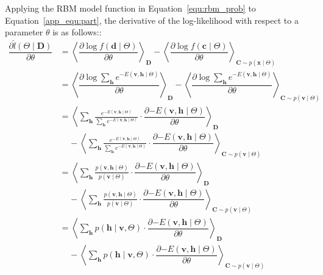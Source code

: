 Applying the RBM model function in Equation~\ref{equ:rbm_prob} to Equation~\ref{app_equ:part}, the derivative of the log-likelihood with respect to a parameter $\theta$ is as follows::
\begin{equation}
\begin{aligned}
\dfrac{\partial \hat{l} (\Theta \mid \mathbf{D})}{\partial \theta} 
& = \left \langle \dfrac{\partial \log f(\mathbf{d} \mid \Theta)}{\partial \theta}\right \rangle_{\mathbf{D}} -\left \langle \dfrac{\partial \log f(\mathbf{c} \mid \Theta)}{\partial \theta}\right \rangle_{\mathbf{C} \sim p(\mathbf{x} \mid \Theta)}  \\
& = \left \langle \dfrac{\partial \log \sum_{ \mathbf{h}} e^{{-E}(\mathbf{v}, \mathbf{h} \mid \Theta)}}{\partial \theta}\right \rangle_{\mathbf{D}} 
-\left \langle \dfrac{\partial \log \sum_{ \mathbf{h}} e^{{-E}(\mathbf{v}, \mathbf{h} \mid \Theta)} }{\partial \theta}\right \rangle_{\mathbf{C} \sim p(\mathbf{v} \mid \Theta)}  \\
& = \left \langle \sum_{ \mathbf{h}} \frac{e^{{-E}(\mathbf{v}, \mathbf{h} \mid \Theta)}}{\sum_{ \mathbf{h}} e^{{-E}(\mathbf{v}, \mathbf{h} \mid \Theta)}} \cdot \dfrac{\partial {-E}(\mathbf{v}, \mathbf{h} \mid \Theta)}{\partial \theta} \right \rangle_{\mathbf{D}} 
\\&~~~~~- \left \langle \sum_{ \mathbf{h}} \frac{e^{{-E}(\mathbf{v}, \mathbf{h} \mid \Theta)}}{\sum_{ \mathbf{h}} e^{{-E}(\mathbf{v}, \mathbf{h} \mid \Theta)}} \cdot \dfrac{\partial {-E}(\mathbf{v}, \mathbf{h} \mid \Theta)}{\partial \theta} \right \rangle_{\mathbf{C} \sim p(\mathbf{v} \mid \Theta)}  \\
& = \left \langle \sum_{ \mathbf{h}} \frac{p(\mathbf{v}, \mathbf{h} \mid \Theta)}{p(\mathbf{v} \mid \Theta)} \cdot \dfrac{\partial {-E}(\mathbf{v}, \mathbf{h} \mid \Theta)}{\partial \theta} \right \rangle_{\mathbf{D}} 
\\&~~~~~- \left \langle \sum_{ \mathbf{h}}  \frac{p(\mathbf{v}, \mathbf{h} \mid \Theta)}{p(\mathbf{v} \mid \Theta)} \cdot \dfrac{\partial {-E}(\mathbf{v}, \mathbf{h} \mid \Theta)}{\partial \theta} \right \rangle_{\mathbf{C} \sim p(\mathbf{v} \mid \Theta)}  \\
& = \left \langle \sum_{ \mathbf{h}} p( \mathbf{h} \mid \mathbf{v}, \Theta) \cdot \dfrac{\partial {-E}(\mathbf{v}, \mathbf{h} \mid \Theta)}{\partial \theta} \right \rangle_{\mathbf{D}} 
\\&~~~~~- \left \langle \sum_{ \mathbf{h}} p( \mathbf{h} \mid \mathbf{v}, \Theta) \cdot \dfrac{\partial {-E}(\mathbf{v}, \mathbf{h} \mid \Theta)}{\partial \theta} \right \rangle_{\mathbf{C} \sim p(\mathbf{v} \mid \Theta)}  \\

\end{aligned}
\end{equation}

